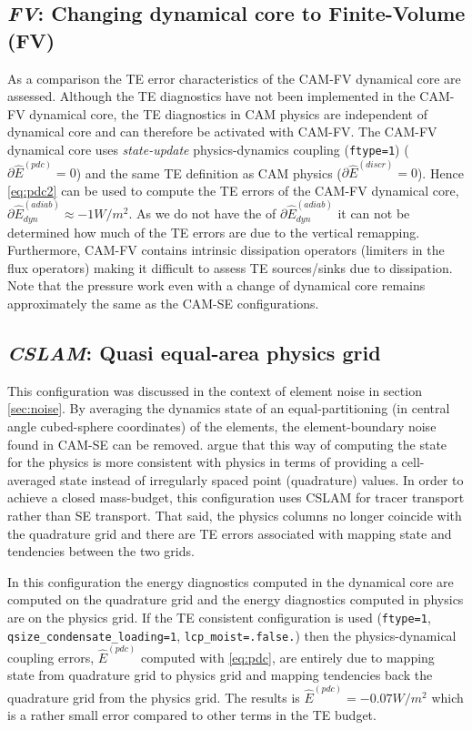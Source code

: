 \documentclass[draft,linenumbers]{agujournal}
\newcommand*{\gi}[1]{\widehat{#1}}
\begin{document}
\subsection{{\em{FV}}: Changing dynamical core to Finite-Volume (FV)}\label{sec:cam-fv}
As a comparison the TE error characteristics of the CAM-FV dynamical core are assessed. Although the TE diagnostics have not been implemented in the CAM-FV dynamical core, the TE diagnostics in CAM physics are independent of dynamical core and can therefore be activated with CAM-FV. The CAM-FV dynamical core uses {\em{state-update}} physics-dynamics coupling ({\tt{ftype=1}}) ($\partial \gi{E}^{(pdc)}=0$) and the same TE definition as CAM physics ($\partial \gi{E}^{(discr)}=0$). Hence \eqref{eq:pdc2} can be used to compute the TE errors of the CAM-FV dynamical core, $\partial \gi{E}^{(adiab)}_{dyn}\approx -1 W/m^2$. As we do not have the {\color{red}{breakdown}} of $\partial \gi{E}^{(adiab)}_{dyn}$ it can not be determined how much of the TE errors are due to the vertical remapping. Furthermore, CAM-FV contains intrinsic dissipation operators (limiters in the flux operators) making it difficult to assess TE sources/sinks due to dissipation. Note that the pressure work {\color{red}{error}} even with a change of dynamical core remains approximately the same as the CAM-SE configurations.
\subsection{{\em{CSLAM}}: Quasi equal-area physics grid}\label{sec:cslam}
This configuration was discussed in the context of element noise in section \ref{sec:noise}. By averaging the dynamics state of an equal-partitioning (in central angle cubed-sphere coordinates) of the elements, the element-boundary noise found in CAM-SE can be removed. \cite{LetAl2018JAMES} argue that this way of computing the state for the physics is more consistent with physics in terms of providing a cell-averaged state instead of irregularly spaced point (quadrature) values. In order to achieve a closed mass-budget, this configuration uses CSLAM for tracer transport rather than SE transport. That said, the physics columns no longer coincide with the quadrature grid and there are TE errors associated with mapping state and tendencies between the two grids.

In this configuration the energy diagnostics computed in the dynamical core are computed on the quadrature grid and the energy diagnostics computed in physics are on the physics grid. If the TE consistent configuration is used ({\tt{ftype=1}}, {\tt{qsize\_condensate\_loading=1}}, {\tt{lcp\_moist=.false.}}) then the physics-dynamical coupling errors, $\gi{E}^{(pdc)}$ computed with \eqref{eq:pdc}, are entirely due to mapping state from quadrature grid to physics grid and mapping tendencies back the quadrature grid from the physics grid. The results is $\gi{E}^{(pdc)}=-0.07W/m^2$ which is a rather small error compared to other terms in the TE budget.
\end{document}
